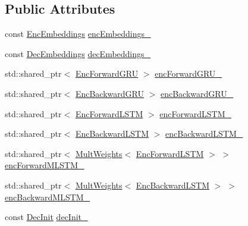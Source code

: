 \subsection*{Public Attributes}
\begin{DoxyCompactItemize}
\item 
const \hyperlink{structamunmt_1_1GPU_1_1Weights_1_1EncEmbeddings}{Enc\+Embeddings} \hyperlink{structamunmt_1_1GPU_1_1Weights_aa829b8f4fe98e626cec7943d544eeb8a}{enc\+Embeddings\+\_\+}
\item 
const \hyperlink{structamunmt_1_1GPU_1_1Weights_1_1DecEmbeddings}{Dec\+Embeddings} \hyperlink{structamunmt_1_1GPU_1_1Weights_ad38dafd4e5728942b6cda10bacefdf90}{dec\+Embeddings\+\_\+}
\item 
std\+::shared\+\_\+ptr$<$ \hyperlink{structamunmt_1_1GPU_1_1Weights_1_1EncForwardGRU}{Enc\+Forward\+G\+RU} $>$ \hyperlink{structamunmt_1_1GPU_1_1Weights_ae3e981d85902d35f02e4ab44074cb4f6}{enc\+Forward\+G\+R\+U\+\_\+}
\item 
std\+::shared\+\_\+ptr$<$ \hyperlink{structamunmt_1_1GPU_1_1Weights_1_1EncBackwardGRU}{Enc\+Backward\+G\+RU} $>$ \hyperlink{structamunmt_1_1GPU_1_1Weights_abbf3ec77d064c218b7c4cb0262232a5d}{enc\+Backward\+G\+R\+U\+\_\+}
\item 
std\+::shared\+\_\+ptr$<$ \hyperlink{structamunmt_1_1GPU_1_1Weights_1_1EncForwardLSTM}{Enc\+Forward\+L\+S\+TM} $>$ \hyperlink{structamunmt_1_1GPU_1_1Weights_a60e76f883e60cff698cc5894c52a5610}{enc\+Forward\+L\+S\+T\+M\+\_\+}
\item 
std\+::shared\+\_\+ptr$<$ \hyperlink{structamunmt_1_1GPU_1_1Weights_1_1EncBackwardLSTM}{Enc\+Backward\+L\+S\+TM} $>$ \hyperlink{structamunmt_1_1GPU_1_1Weights_a10f4a480601758e649528fcfa51427d0}{enc\+Backward\+L\+S\+T\+M\+\_\+}
\item 
std\+::shared\+\_\+ptr$<$ \hyperlink{structamunmt_1_1GPU_1_1Weights_1_1MultWeights}{Mult\+Weights}$<$ \hyperlink{structamunmt_1_1GPU_1_1Weights_1_1EncForwardLSTM}{Enc\+Forward\+L\+S\+TM} $>$ $>$ \hyperlink{structamunmt_1_1GPU_1_1Weights_a647b55f2d86d7006c0af82d44c2081f7}{enc\+Forward\+M\+L\+S\+T\+M\+\_\+}
\item 
std\+::shared\+\_\+ptr$<$ \hyperlink{structamunmt_1_1GPU_1_1Weights_1_1MultWeights}{Mult\+Weights}$<$ \hyperlink{structamunmt_1_1GPU_1_1Weights_1_1EncBackwardLSTM}{Enc\+Backward\+L\+S\+TM} $>$ $>$ \hyperlink{structamunmt_1_1GPU_1_1Weights_ac64f6043d8c81c154a0d751c2a95e9bf}{enc\+Backward\+M\+L\+S\+T\+M\+\_\+}
\item 
const \hyperlink{structamunmt_1_1GPU_1_1Weights_1_1DecInit}{Dec\+Init} \hyperlink{structamunmt_1_1GPU_1_1Weights_a5b9ce1181f97a74b6cfaaf8885b14de7}{dec\+Init\+\_\+}

\end{DoxyCompactItemize}
